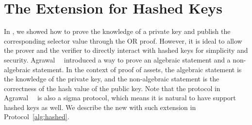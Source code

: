 \chapter{The Extension for Hashed Keys}
\label{sec:hashedkeys}

In \bootstrap, we showed how to prove the knowledge of a private key and publish the corresponding selector value through the OR proof. However, it is ideal to allow the prover and the verifier to directly interact with hashed keys for simplicity and security. Agrawal~\etal~\cite{composite} introduced a way to prove an algebraic statement and a non-algebraic statement. In the context of proof of assets, the algebraic statement is the knowledge of the private key, and the non-algebraic statement is the correctness of the hash value of the public key. Note that the protocol in Agrawal~\etal~\cite{composite} is also a sigma protocol, which means it is natural to have \Sys support hashed keys as well. We describe the new \bootstrap with such extension in Protocol~\ref{alg:hashed}.


